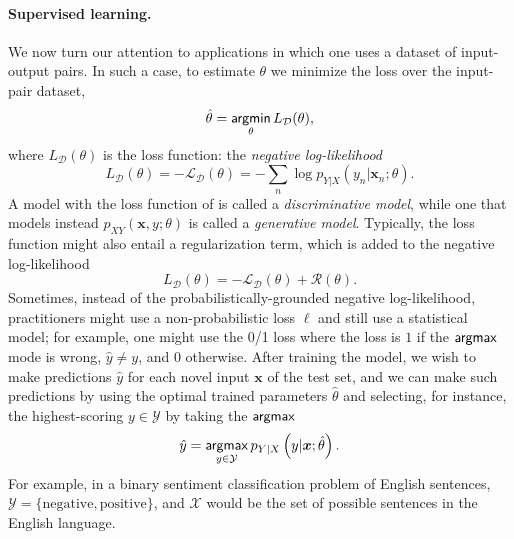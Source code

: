 \paragraph*{Supervised learning.} We now turn our attention to applications
in which one uses a dataset of input-output pairs. In such a case,
to estimate $\theta$ we minimize the loss over the input-pair dataset,
%
\begin{equation}
    \hat{\theta} = \operatorname*{\mathsf{argmin}}_\theta L_\mathcal{D}(\theta),
\end{equation}
%
where $L_\mathcal{D}(\theta)$ is the loss function:
the \textit{negative log-likelihood}
%
\begin{equation}
    L_\mathcal{D}(\theta) = -\mathcal{L}_\mathcal{D}(\theta) =
    - \sum_n \log p_{Y|X}(y_n|\bm{x}_n; \theta).
    \label{eq:discr-loss}
\end{equation}
%
A model with the loss function of  is called a
\textit{discriminative model}, while one that models instead
$p_{XY}(\bm{x}, y; \theta)$ is called a \textit{generative model}.
Typically, the loss function might also entail a regularization term,
which is added to the negative log-likelihood
%
\begin{equation}
    L_\mathcal{D}(\theta) = -\mathcal{L}_\mathcal{D}(\theta) + \mathcal{R}(\theta).
\end{equation}
%
Sometimes, instead of the probabilistically-grounded negative
log-likelihood, practitioners might use a non-probabilistic loss $\ell$ and
still use a statistical model; for example, one might use the 0/1
loss where the loss is $1$ if the $\operatorname*{\mathsf{argmax}}$ mode is wrong, \ie
$\hat{y}\neq y$, and $0$ otherwise. After training the model, we wish
to make predictions $\hat{y}$ for each novel input $\bm{x}$ of the
test set, and we can make such predictions by using the optimal
trained parameters $\hat{\theta}$ and selecting, for instance, the highest-scoring
$y\in\mathcal{Y}$ by taking the $\operatorname*{\mathsf{argmax}}$
%
\begin{equation}
    \hat{y}=\operatorname*{\mathsf{argmax}}_{y\in\mathcal{Y}}p_{Y|X}\left(y|\bm{x};\hat{\theta}\right).
\end{equation}
%
For example, in a binary sentiment classification problem of English
sentences, $\mathcal{Y}=\{\text{negative},\text{positive}\}$, and
$\mathcal{X}$ would be the set of possible sentences in the English
language.

